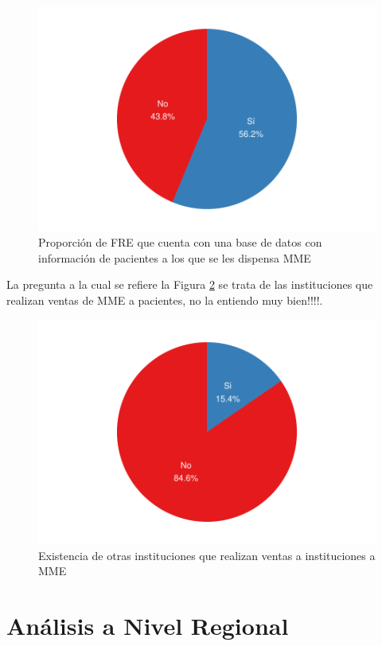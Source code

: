 \documentclass[
]{book}
\begin{document}
\begin{figure}
\includegraphics[width=0.85\linewidth]{InformeFinal_files/figure-latex/InformPacientes-1} \caption{Proporción de FRE que cuenta con una base de datos con información de pacientes a los que se les dispensa MME}\label{fig:InformPacientes}
\end{figure}

La pregunta a la cual se refiere la Figura \ref{fig:InstitucionesAdicionales} se trata de las instituciones que realizan ventas de MME a pacientes, no la entiendo muy bien!!!!.

\begin{figure}
\includegraphics[width=0.85\linewidth]{InformeFinal_files/figure-latex/InstitucionesAdicionales-1} \caption{Existencia de otras instituciones que realizan ventas a instituciones a MME}\label{fig:InstitucionesAdicionales}
\end{figure}

\hypertarget{anuxe1lisis-a-nivel-regional}{%
\chapter{Análisis a Nivel Regional}\label{anuxe1lisis-a-nivel-regional}}
\end{document}
